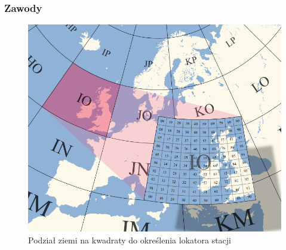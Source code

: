\documentclass[]{mgr}
\begin{document}
                \subsubsection{Zawody}
                    \begin{figure}
                        \vspace{-25pt}
                        \begin{center}
                            \includegraphics[scale=0.20]{gridsquare}
                        \end{center}
                        \vspace{-20pt}
                        \caption{Podział ziemi na kwadraty do określenia lokatora stacji}
                        \vspace{-10pt}
                        \label{fig:gridsquare}
                    \end{figure}
\end{document}
